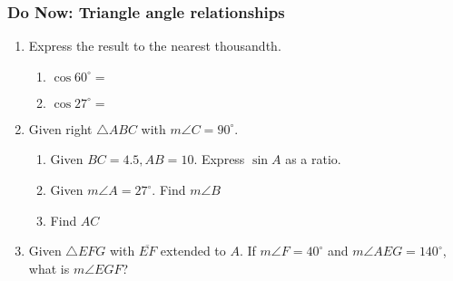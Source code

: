 \documentclass[12pt, oneside]{article}
\begin{document}
\subsubsection*{Do Now: Triangle angle relationships}
 \begin{enumerate}

\item Express the result to the nearest thousandth.  \vspace{.5cm}
  \begin{multicols}{2}
    \begin{enumerate}
      \item $\cos 60^\circ = $
      \item $\cos 27^\circ = $
    \end{enumerate}
  \end{multicols} \vspace{0.25cm}

  \item Given right $\triangle ABC$ with $m\angle C=90^\circ$.
    \begin{center}
       \vspace{.1cm}
    \end{center}
      \begin{enumerate}
        \item Given $BC=4.5, AB=10$. Express $\sin A$ as a ratio. \vspace{1cm}
        \item Given $m\angle A = 27^\circ$. Find $m\angle B$ \vspace{1cm}
        \item Find $AC$ \vspace{2cm}
      \end{enumerate}

  \item Given  $\triangle EFG$ with $\overline{EF}$ extended to $A$. If $m\angle F=40^\circ$ and $m\angle AEG=140^\circ$, what is $m\angle EGF$?
    \begin{center}
    \end{center}


\end{enumerate}
\end{document}
